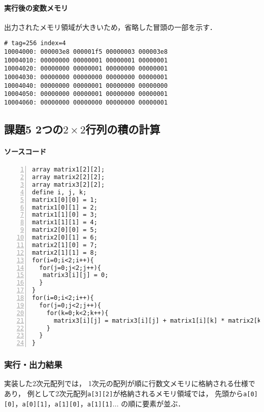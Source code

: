\paragraph*{実行後の変数メモリ}
出力されたメモリ領域が大きいため，省略した冒頭の一部を示す．

\begin{Verbatim}[numbers=none, frame=single,
  fontsize=\small, baselinestretch=0.8]
  # tag=256 index=4
10004000: 000003e8 000001f5 00000003 000003e8
10004010: 00000000 00000001 00000001 00000001
10004020: 00000000 00000001 00000000 00000001
10004030: 00000000 00000000 00000000 00000001
10004040: 00000000 00000001 00000000 00000000
10004050: 00000000 00000001 00000000 00000001
10004060: 00000000 00000000 00000000 00000001
\end{Verbatim}

\subsection{課題5 2つの$2 \times 2$行列の積の計算}
\paragraph*{ソースコード}

\begin{Verbatim}[numbers=left, xleftmargin=10mm, numbersep=6pt, frame=single,
  fontsize=\small, baselinestretch=0.8]
array matrix1[2][2];
array matrix2[2][2];
array matrix3[2][2];
define i, j, k;
matrix1[0][0] = 1;
matrix1[0][1] = 2;
matrix1[1][0] = 3;
matrix1[1][1] = 4;
matrix2[0][0] = 5;
matrix2[0][1] = 6;
matrix2[1][0] = 7;
matrix2[1][1] = 8;
for(i=0;i<2;i++){
  for(j=0;j<2;j++){
   matrix3[i][j] = 0;
  }
}
for(i=0;i<2;i++){
  for(j=0;j<2;j++){
    for(k=0;k<2;k++){
      matrix3[i][j] = matrix3[i][j] + matrix1[i][k] * matrix2[k][j];
    }
  }
}
\end{Verbatim}

\subsubsection{実行・出力結果}
実装した2次元配列では，
1次元の配列が順に行数文メモリに格納される仕様であり，
例として2次元配列\verb|a[3][2]|が格納されるメモリ領域では，
先頭から\verb|a[0][0]|，\verb|a[0][1]|，\verb|a[1][0]|，\verb|a[1][1]|...
の順に要素が並ぶ．

